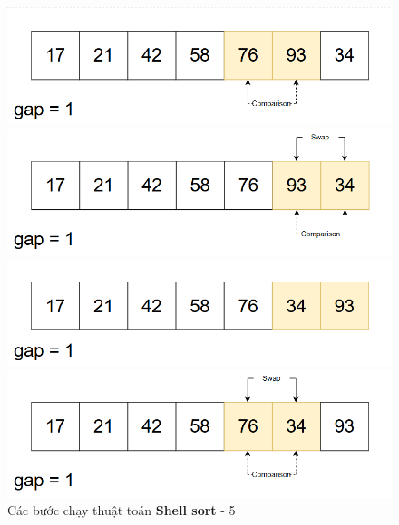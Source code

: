 \begin{figure}[H]
    \centering
    \includegraphics[width=1\linewidth]{img/shell_sort/17.png}
    \vspace{0.15cm}

    \includegraphics[width=1\linewidth]{img/shell_sort/18.png}
    \vspace{0.15cm}

    \includegraphics[width=1\linewidth]{img/shell_sort/19.png}
    \vspace{0.15cm}

    \includegraphics[width=1\linewidth]{img/shell_sort/20.png}
    \caption{Các bước chạy thuật toán \textbf{Shell sort} - 5}
\end{figure}

